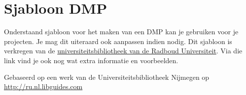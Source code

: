 \chapter{Sjabloon DMP}
\label{ap:dmp}
Onderstaand sjabloon voor het maken van een DMP kan je gebruiken voor je projecten. Je mag dit uiteraard ook aanpassen indien nodig. Dit sjabloon is verkregen van de \href{https://libguides.ru.nl/datamanagement/dm}{\textsf{universiteitsbibliotheek van de Radboud Universiteit}}. Via die link vind je ook nog wat extra informatie en voorbeelden. 

Gebaseerd op een werk van de Universiteitsbibliotheek Nijmegen op \href{http://ru.nl.libguides.com}{\textsf{http://ru.nl.libguides.com}}

